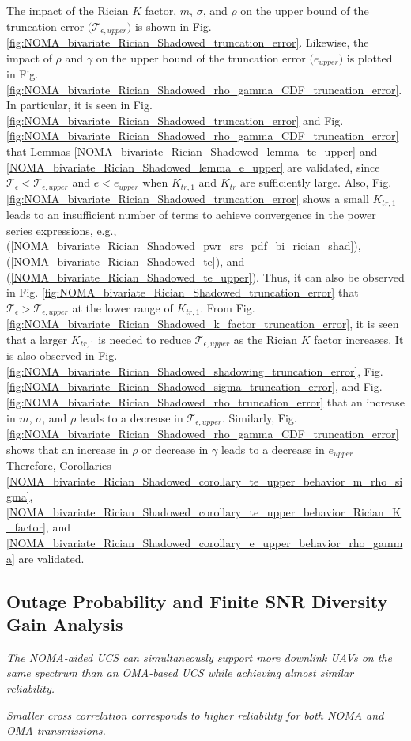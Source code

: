 The impact of the Rician $K$ factor, $m$, $\sigma$, and $\rho$ on the upper bound of the truncation error $\big(\mathcal{T}_{\epsilon,upper}\big)$ is shown in Fig. \ref{fig:NOMA_bivariate_Rician_Shadowed_truncation_error}. Likewise, the impact of $\rho$ and $\gamma$ on the upper bound of the truncation error $\big(e_{upper}\big)$ is plotted in Fig. \ref{fig:NOMA_bivariate_Rician_Shadowed_rho_gamma_CDF_truncation_error}. In particular, it is seen in Fig. \ref{fig:NOMA_bivariate_Rician_Shadowed_truncation_error} and Fig. \ref{fig:NOMA_bivariate_Rician_Shadowed_rho_gamma_CDF_truncation_error} that Lemmas \ref{NOMA_bivariate_Rician_Shadowed_lemma_te_upper} and \ref{NOMA_bivariate_Rician_Shadowed_lemma_e_upper} are validated, since $\mathcal{T}_{\epsilon} < \mathcal{T}_{\epsilon,upper}$ and $e < e_{upper}$ when $K_{tr,1}$ and $K_{tr}$ are sufficiently large. Also, Fig. \ref{fig:NOMA_bivariate_Rician_Shadowed_truncation_error} shows a small $K_{tr,1}$ leads to an insufficient number of terms to achieve convergence in the power series expressions, e.g., (\ref{NOMA_bivariate_Rician_Shadowed_pwr_srs_pdf_bi_rician_shad}), (\ref{NOMA_bivariate_Rician_Shadowed_te}), and (\ref{NOMA_bivariate_Rician_Shadowed_te_upper}). Thus, it can also be observed in Fig. \ref{fig:NOMA_bivariate_Rician_Shadowed_truncation_error} that $\mathcal{T}_{\epsilon} > \mathcal{T}_{\epsilon,upper}$ at the lower range of $K_{tr,1}$. From Fig. \ref{fig:NOMA_bivariate_Rician_Shadowed_k_factor_truncation_error}, it is seen that a larger $K_{tr,1}$ is needed to reduce $\mathcal{T}_{\epsilon,upper}$ as the Rician $K$ factor increases. It is also observed in Fig. \ref{fig:NOMA_bivariate_Rician_Shadowed_shadowing_truncation_error}, Fig. \ref{fig:NOMA_bivariate_Rician_Shadowed_sigma_truncation_error}, and Fig. \ref{fig:NOMA_bivariate_Rician_Shadowed_rho_truncation_error} that an increase in $m$, $\sigma$, and $\rho$ leads to a decrease in $\mathcal{T}_{\epsilon,upper}$. Similarly, Fig. \ref{fig:NOMA_bivariate_Rician_Shadowed_rho_gamma_CDF_truncation_error} shows that an increase in $\rho$ or decrease in $\gamma$ leads to a decrease in $e_{upper}$ Therefore, Corollaries \ref{NOMA_bivariate_Rician_Shadowed_corollary_te_upper_behavior_m_rho_sigma}, \ref{NOMA_bivariate_Rician_Shadowed_corollary_te_upper_behavior_Rician_K_factor}, and \ref{NOMA_bivariate_Rician_Shadowed_corollary_e_upper_behavior_rho_gamma} are validated.

\subsection{Outage Probability and Finite SNR Diversity Gain Analysis}
\begin{observation} 
\emph{The NOMA-aided UCS can simultaneously support more downlink UAVs on the same spectrum than an OMA-based UCS while achieving almost similar reliability.}
\end{observation}
\begin{observation} 
\emph{Smaller cross correlation corresponds to higher reliability for both NOMA and OMA transmissions.}
\end{observation}

